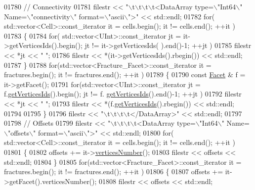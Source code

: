 \begin{DoxyCode}
01780     \textcolor{comment}{//  Connectivity}
01781     filestr << \textcolor{stringliteral}{"\(\backslash\)t\(\backslash\)t\(\backslash\)t\(\backslash\)t<DataArray type=\(\backslash\)"Int64\(\backslash\)" Name=\(\backslash\)"connectivity\(\backslash\)" format=\(\backslash\)"ascii\(\backslash\)">"} << std::endl;
01782     \textcolor{keywordflow}{for}( std::vector<Cell>::const\_iterator it = cells.begin(); it != cells.end(); ++it )
01783     \{
01784         \textcolor{keywordflow}{for}( std::vector<UInt>::const\_iterator jt = it->getVerticesIds().begin(); jt != it->getVerticesIds(
      ).end()-1; ++jt )
01785             filestr << *jt << \textcolor{stringliteral}{" "};
01786         filestr << *(it->getVerticesIds().rbegin()) << std::endl;
01787     \}
01788     \textcolor{keywordflow}{for}(std::vector<Fracture\_Facet>::const\_iterator it = fractures.begin(); it != fractures.end(); ++it )
01789     \{
01790         \textcolor{keyword}{const} \hyperlink{classFVCode3D_1_1Rigid__Mesh_1_1Facet}{Facet} & f = it->getFacet();
01791         \textcolor{keywordflow}{for}(std::vector<UInt>::const\_iterator jt = f.\hyperlink{classFVCode3D_1_1Rigid__Mesh_1_1Facet_af92ad0b6b79c69f6c04584301b8998a7}{getVerticesIds}().begin(); jt != f.
      \hyperlink{classFVCode3D_1_1Rigid__Mesh_1_1Facet_af92ad0b6b79c69f6c04584301b8998a7}{getVerticesIds}().end()-1; ++jt )
01792             filestr << *jt << \textcolor{stringliteral}{" "};
01793         filestr << *(f.\hyperlink{classFVCode3D_1_1Rigid__Mesh_1_1Facet_af92ad0b6b79c69f6c04584301b8998a7}{getVerticesIds}().rbegin()) << std::endl;
01794 
01795     \}
01796     filestr << \textcolor{stringliteral}{"\(\backslash\)t\(\backslash\)t\(\backslash\)t\(\backslash\)t</DataArray>"} << std::endl;
01797 
01798     \textcolor{comment}{//  Offsets}
01799     filestr << \textcolor{stringliteral}{"\(\backslash\)t\(\backslash\)t\(\backslash\)t\(\backslash\)t<DataArray type=\(\backslash\)"Int64\(\backslash\)" Name=\(\backslash\)"offsets\(\backslash\)" format=\(\backslash\)"ascii\(\backslash\)">"} << std::endl;
01800     \textcolor{keywordflow}{for}( std::vector<Cell>::const\_iterator it = cells.begin(); it != cells.end(); ++it )
01801     \{
01802         offsets += it->\hyperlink{classFVCode3D_1_1Rigid__Mesh_1_1Facet_a5d18db39a0eeb85e6a4afc2b09813201}{verticesNumber}();
01803         filestr << offsets << std::endl;
01804     \}
01805     \textcolor{keywordflow}{for}(std::vector<Fracture\_Facet>::const\_iterator it = fractures.begin(); it != fractures.end(); ++it )
01806     \{
01807         offsets += it->getFacet().verticesNumber();
01808         filestr << offsets << std::endl;

\end{DoxyCode}
